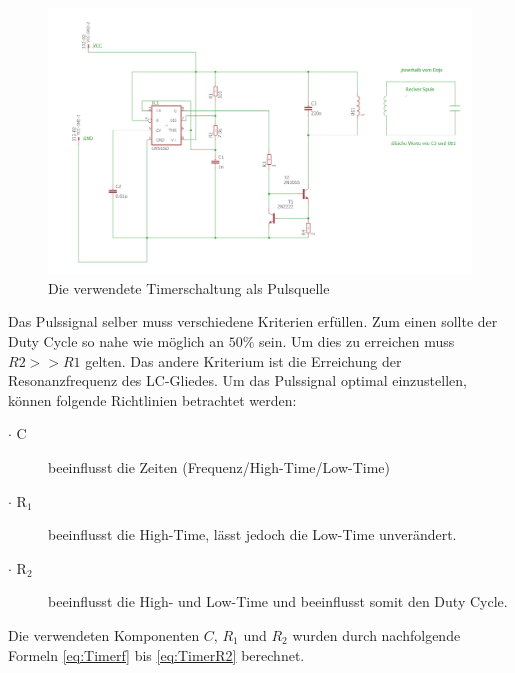 \begin{figure}[H]
	\begin{center}
		\includegraphics[width=\textwidth]{data/Tranceiver.png}
		\caption[Ne555]{Die verwendete Timerschaltung als Pulsquelle} %
		\label{fig:Tranceiver-Schaltung}
	\end{center}
\end{figure}
 
Das Pulssignal selber muss verschiedene Kriterien erfüllen. Zum einen sollte der Duty Cycle so nahe wie möglich an $50\%$ sein. Um dies zu erreichen muss $R2 >> R1$ gelten. Das andere Kriterium ist die Erreichung der Resonanzfrequenz des LC-Gliedes. Um das Pulssignal optimal einzustellen, können folgende Richtlinien betrachtet werden:
\begin{description}
	\item [$\cdot$ C] beeinflusst die Zeiten (Frequenz/High-Time/Low-Time)
	\item [$\cdot$ R$_{1}$] beeinflusst die High-Time, lässt jedoch die Low-Time unverändert.
	\item [$\cdot$ R$_{2}$ ] beeinflusst die High- und Low-Time und beeinflusst somit den Duty Cycle.
\end{description}

Die verwendeten Komponenten $C$, $R_{1}$ und $R_{2}$ wurden durch nachfolgende Formeln \ref{eq:Timerf} bis \ref{eq:TimerR2} berechnet. 

